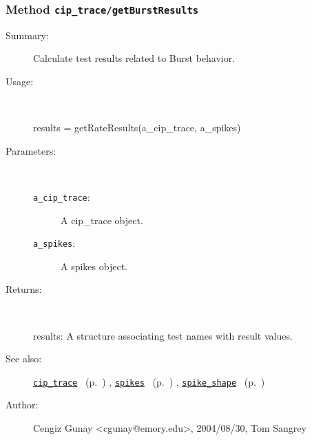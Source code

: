 \subsubsection[Method \texttt{getBurstResults}]{Method \texttt{cip\_trace/getBurstResults}}%
%
\label{ref_cip_trace__getBurstResults}%
\hypertarget{ref_cip_trace__getBurstResults}{}%
\begin{description}
\item[Summary:]Calculate test results related to Burst behavior.
%
\item[Usage:]~%
\begin{lyxcode}%
results = getRateResults(a\_cip\_trace, a\_spikes)
%
\end{lyxcode}%
%
%
\item[Parameters:]~
\begin{description}%
\item[\texttt{a\_cip\_trace}:]
 A cip\_trace object.
\item[\texttt{a\_spikes}:]
 A spikes object.
\end{description}%
%
\item[Returns:
]~

	results: A structure associating test names with result values.
%
%
\item[See also:]%
\hyperlink{ref_cip_trace}{\texttt{cip\_trace}}%
\ (p.~\pageref{ref_cip_trace})%
%
, \hyperlink{ref_spikes}{\texttt{spikes}}%
\ (p.~\pageref{ref_spikes})%
%
, \hyperlink{ref_spike_shape}{\texttt{spike\_shape}}%
\ (p.~\pageref{ref_spike_shape})%
%
%
\item[Author:]%
Cengiz Gunay <cgunay@emory.edu>, 2004/08/30, Tom Sangrey
%
\end{description}
\methodline%
